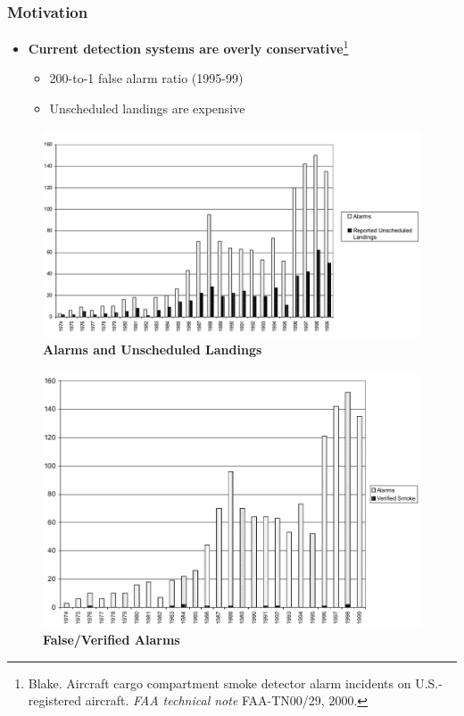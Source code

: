\documentclass[9pt]{beamer}
\begin{document}
\begin{frame}
\frametitle{Motivation}
\label{sec-5-2}

\begin{itemize}
\item \textbf{Current detection systems are overly conservative}\footnote{Blake. Aircraft cargo compartment smoke detector alarm incidents on U.S.-registered aircraft. \emph{FAA technical note} FAA-TN00/29, 2000.
 }
\begin{itemize}
\item 200-to-1 false alarm ratio (1995-99)
\item Unscheduled landings are expensive
\end{itemize}
\end{itemize}
\centering
\begin{minipage}[b]{0.45\linewidth}
\begin{figure}
\includegraphics[width=0.9\linewidth]{alarmlandings.png} \\
\textbf{Alarms and Unscheduled Landings}
\end{figure}
\end{minipage}
\begin{minipage}[b]{0.45\linewidth}
\begin{figure}
\includegraphics[width=0.9\linewidth]{alarms_vs_verified.png} \\
\textbf{False/Verified Alarms}
\end{figure}
\end{minipage}
\end{frame}
\end{document}

